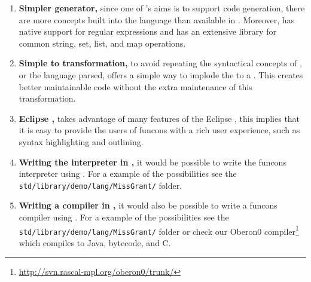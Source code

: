 \documentclass[a4paper, oneside, notitlepage]{article}
\newcommand{\CSF}{\textsmaller{CSF}\xspace}
\newcommand{\ASFSDF}{\textsmaller{ASF\hspace{-.05em}\raisebox{.4ex}{\tiny\textbf{+}}SDF}\xspace}
\newcommand{\AST}{\textsmaller{AST}\xspace}
\newcommand{\CST}{\textsmaller{CST}\xspace}
\newcommand{\IDE}{\textsmaller{IDE}\xspace}
\newcommand{\JVM}{\textsmaller{JVM}\xspace}
\newcommand{\filename}[1]{\texttt{#1}\xspace}
\begin{document}
\begin{enumerate}
	\newcommand{\advantage}[2]{\item \textbf{#1,} #2}

	\advantage
		{Simpler generator}
		{
			since one of \Rascal's aims is to support code generation, there are
			more concepts built into the language than available in \ASFSDF.
			Moreover, \Rascal has native support for regular
			expressions and has an extensive library for common string, set,
			list, and map operations.
		}

	\advantage
		{Simple \CST to \AST transformation}
		{
			to avoid repeating the syntactical concepts of \CSF, or the language
			parsed, \Rascal offers a simple way to implode the \CST to a \AST.
			This creates better maintainable code without the extra maintenance
			of this transformation.
		}

	\advantage
		{Eclipse \IDE}
		{
			\Rascal takes advantage of many features of the Eclipse \IDE, this
			implies that it is easy to provide the users of funcons with a rich
			user experience, such as syntax highlighting and outlining.
		}

	\advantage
		{Writing the interpreter in \Rascal}
		{
			it would be possible to write the funcons interpreter using \Rascal.
			For a example of the possibilities see the
			\filename{std/library/demo/lang/MissGrant/} folder.
		}

	\advantage
		{Writing a compiler in \Rascal}
		{
			it would also be possible to write a funcons compiler using \Rascal.
			For a example of the possibilities see the
			\filename{std/library/demo/lang/MissGrant/} folder or check our
			Oberon0
			compiler\footnote{\url{http://svn.rascal-mpl.org/oberon0/trunk/}}
			which compiles to Java, \JVM bytecode, and C.
		}
\end{enumerate}
\end{document}
